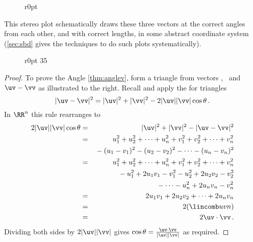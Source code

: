 \begin{example}
\begin{solution}
\begin{itemize}
\end{itemize}
\begin{wrapfigure}[7]r{0pt}
 {
}
\end{wrapfigure}

This stereo plot schematically draws these three vectors at the correct angles from each other, and with correct lengths, in some abstract coordinate system (\cref{sec:sbd} gives the techniques to do such plots systematically).\aqed
\par
\end{solution}
\end{example}


\begin{wrapfigure}r{0pt}
\def\vecopsHook{\node[above] at (axis cs:0,0) {$\qquad\theta$};}
35\end{wrapfigure}
\begin{proof} 
To prove the Angle \cref{thm:anglev}, form a triangle from vectors \uv, \vv\ and \(\uv-\vv\) as illustrated to the right.
Recall and apply the  for triangles
\begin{equation*}
|\uv-\vv|^2=|\uv|^2+|\vv|^2-2|\uv||\vv|\cos\theta\,.
\end{equation*}
In \(\RR^n\) this rule rearranges to
\begin{eqnarray*}
2|\uv||\vv|\cos\theta
&=&|\uv|^2+|\vv|^2-|\uv-\vv|^2
\\&=&u_1^2+u_2^2+\cdots+u_n^2
+v_1^2+v_2^2+\cdots+v_n^2
\\&&{}
-(u_1-v_1)^2-(u_2-v_2)^2-\cdots-(u_n-v_n)^2
\\&=&u_1^2+u_2^2+\cdots+u_n^2
+v_1^2+v_2^2+\cdots+v_n^2
\\&&{}
-u_1^2+2u_1v_1-v_1^2-u_2^2+2u_2v_2-v_2^2
\\&&{}
-\cdots-u_n^2+2u_nv_n-v_n^2
\\&=&2u_1v_1+2u_2v_2+\cdots+2u_nv_n
\\&=&2(\lincomb uvn)
\\&=&2\uv\cdot\vv\,.
\end{eqnarray*}
Dividing both sides by \(2|\uv||\vv|\) gives \(\cos\theta=\frac{\uv\cdot\vv}{|\uv||\vv|}\) as required.
\aqed

\end{proof}



